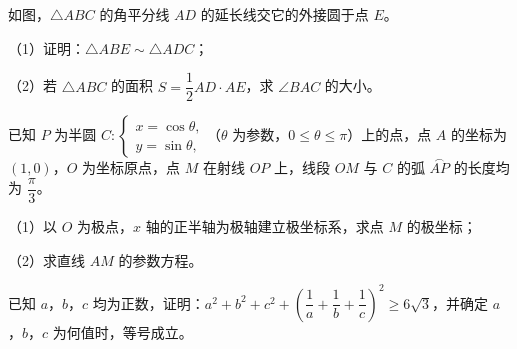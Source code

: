 \begingroup
\renewenvironment{question}{\Needspace{0.5\textheight}}{}
\begin{question}
如图，$\triangle ABC$ 的角平分线 $AD$ 的延长线交它的外接圆于点 $E$。

（1）证明：$\triangle ABE\sim\triangle ADC$；

（2）若 $\triangle ABC$ 的面积 $S=\dfrac12AD\cdot AE$，求 $\angle BAC$ 的大小。
\nopagebreak[4]
\begin{center}\end{center}
\nopagebreak[4]
\end{question}
\endgroup
\begin{question}
已知 $P$ 为半圆 $C:\begin{cases}x=\cos\theta,\\y=\sin\theta,\end{cases}$（$\theta$ 为参数，$0\leqslant\theta\leqslant\pi$）上的点，点 $A$ 的坐标为 $(1,0)$，$O$ 为坐标原点，点 $M$ 在射线 $OP$ 上，线段 $OM$ 与 $C$ 的弧 $\overset{\frown}{AP}$ 的长度均为 $\dfrac{\pi}{3}$。

（1）以 $O$ 为极点，$x$ 轴的正半轴为极轴建立极坐标系，求点 $M$ 的极坐标；

（2）求直线 $AM$ 的参数方程。

\end{question}
\begin{question}
已知 $a$，$b$，$c$ 均为正数，证明：$a^2+b^2+c^2+\left(\dfrac1a+\dfrac1b+\dfrac1c\right)^2\geqslant6\sqrt3$，并确定 $a$，$b$，$c$ 为何值时，等号成立。

\end{question}